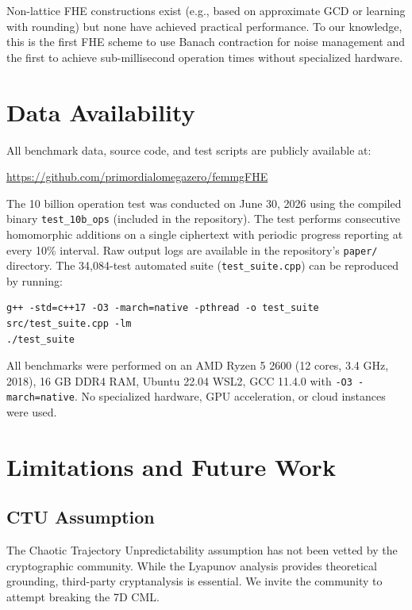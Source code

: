 \documentclass[11pt,a4paper]{article}
\begin{document}
Non-lattice FHE constructions exist (e.g., based on approximate GCD or learning with rounding) but none have achieved practical performance. To our knowledge, this is the first FHE scheme to use Banach contraction for noise management and the first to achieve sub-millisecond operation times without specialized hardware.

\section{Data Availability}

All benchmark data, source code, and test scripts are publicly available at:
\begin{center}
\url{https://github.com/primordialomegazero/femmgFHE}
\end{center}

The 10 billion operation test was conducted on June 30, 2026 using the compiled binary \texttt{test\_10b\_ops} (included in the repository). The test performs consecutive homomorphic additions on a single ciphertext with periodic progress reporting at every 10\% interval. Raw output logs are available in the repository's \texttt{paper/} directory. The 34,084-test automated suite (\texttt{test\_suite.cpp}) can be reproduced by running:

\begin{verbatim}
g++ -std=c++17 -O3 -march=native -pthread -o test_suite src/test_suite.cpp -lm
./test_suite
\end{verbatim}

All benchmarks were performed on an AMD Ryzen 5 2600 (12 cores, 3.4 GHz, 2018), 16 GB DDR4 RAM, Ubuntu 22.04 WSL2, GCC 11.4.0 with \texttt{-O3 -march=native}. No specialized hardware, GPU acceleration, or cloud instances were used.

\section{Limitations and Future Work}
\label{sec:limit}

\subsection{CTU Assumption}

The Chaotic Trajectory Unpredictability assumption has not been vetted by the cryptographic community. While the Lyapunov analysis provides theoretical grounding, third-party cryptanalysis is essential. We invite the community to attempt breaking the 7D CML.
\end{document}
